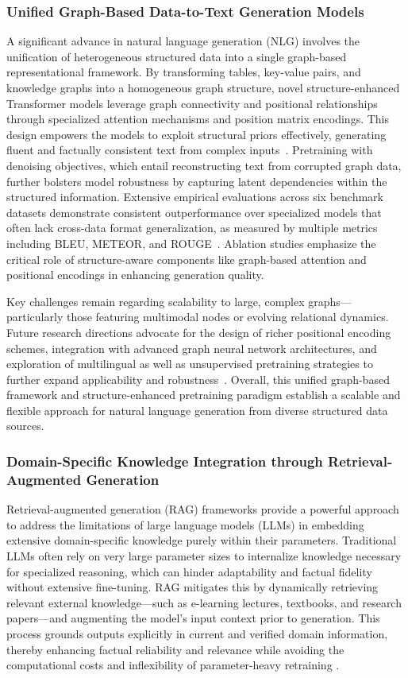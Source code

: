 \documentclass[sigconf]{acmart}
\begin{document}
\subsubsection{Unified Graph-Based Data-to-Text Generation Models}

A significant advance in natural language generation (NLG) involves the unification of heterogeneous structured data into a single graph-based representational framework. By transforming tables, key-value pairs, and knowledge graphs into a homogeneous graph structure, novel structure-enhanced Transformer models leverage graph connectivity and positional relationships through specialized attention mechanisms and position matrix encodings. This design empowers the models to exploit structural priors effectively, generating fluent and factually consistent text from complex inputs~\cite{ref46}. Pretraining with denoising objectives, which entail reconstructing text from corrupted graph data, further bolsters model robustness by capturing latent dependencies within the structured information. Extensive empirical evaluations across six benchmark datasets demonstrate consistent outperformance over specialized models that often lack cross-data format generalization, as measured by multiple metrics including BLEU, METEOR, and ROUGE~\cite{ref46}. Ablation studies emphasize the critical role of structure-aware components like graph-based attention and positional encodings in enhancing generation quality.

Key challenges remain regarding scalability to large, complex graphs—particularly those featuring multimodal nodes or evolving relational dynamics. Future research directions advocate for the design of richer positional encoding schemes, integration with advanced graph neural network architectures, and exploration of multilingual as well as unsupervised pretraining strategies to further expand applicability and robustness~\cite{ref46}. Overall, this unified graph-based framework and structure-enhanced pretraining paradigm establish a scalable and flexible approach for natural language generation from diverse structured data sources.

\subsubsection{Domain-Specific Knowledge Integration through Retrieval-Augmented Generation}

Retrieval-augmented generation (RAG) frameworks provide a powerful approach to address the limitations of large language models (LLMs) in embedding extensive domain-specific knowledge purely within their parameters. Traditional LLMs often rely on very large parameter sizes to internalize knowledge necessary for specialized reasoning, which can hinder adaptability and factual fidelity without extensive fine-tuning. RAG mitigates this by dynamically retrieving relevant external knowledge—such as e-learning lectures, textbooks, and research papers—and augmenting the model’s input context prior to generation. This process grounds outputs explicitly in current and verified domain information, thereby enhancing factual reliability and relevance while avoiding the computational costs and inflexibility of parameter-heavy retraining \cite{ref8}.
\end{document}
